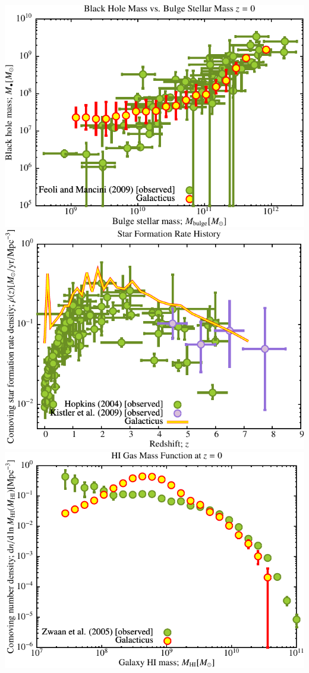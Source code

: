 \includegraphics[scale=0.6]{r256/h100/red_st14_log2/Plot_Black_Hole_vs_Bulge_Mass.pdf}
\includegraphics[scale=0.6]{r256/h100/red_st14_log2/Plot_Star_Formation_History.pdf} \\
\includegraphics[scale=0.6]{r256/h100/red_st14_log2/Plot_HI_Mass_Function.pdf}


